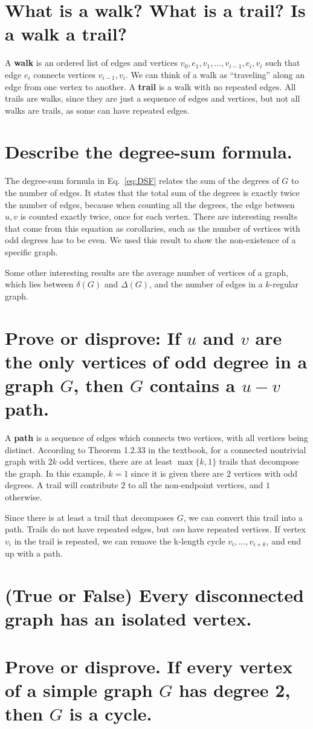\documentclass{article}
\begin{document}
\section{What is a walk? What is a trail? Is a walk a trail?}
A \textbf{walk} is an ordered list of edges and vertices $v_0, e_1, v_1, \dots,v_{i-1}, e_{i}, v_{i}$ such that edge $e_i$
connects vertices $v_{i-1}, v_i$.
We can think of a walk as ``traveling'' along an edge from one vertex to another.
A \textbf{trail} is a walk with no repeated edges.
All trails are walks, since they are just a sequence of edges and vertices, but not all walks are trails, as some
can have repeated edges.

\section{Describe the degree-sum formula.}
The degree-sum formula in Eq.~\ref{eq:DSF} relates the sum of the degrees of $G$ to the number of edges.
It states that the total sum of the degrees is exactly twice the number of edges, because when counting all the degrees,
the edge between $u,v$ is counted exactly twice, once for each vertex.
There are interesting results that come from this equation as corollaries, such as the number of vertices with odd
degrees has to be even.
We used this result to show the non-existence of a specific graph.

Some other interesting results are the average number of vertices of a graph, which lies between $\delta(G)$ and $\Delta(G)$,
and the number of edges in a $k$-regular graph.

\section{Prove or disprove: If $u$ and $v$ are the only vertices of odd degree in a graph $G$, then $G$ contains a $u-v$ path.}
A \textbf{path} is a sequence of edges which connects two vertices, with all vertices being distinct.
According to Theorem 1.2.33 in the textbook, for a connected nontrivial graph with $2k$ odd vertices, there are at least
$\max\{k, 1\}$ trails that decompose the graph.
In this example, $k=1$ since it is given there are $2$ vertices with odd degrees.
A trail will contribute $2$ to all the non-endpoint vertices, and $1$ otherwise.

Since there is at least a trail that decomposes $G$, we can convert this trail into a path.
Trails do not have repeated edges, but \emph{can} have repeated vertices.
If vertex $v_i$ in the trail is repeated, we can remove the k-length cycle $v_i,\dots,v_{i+k}$, and end up with a path.

\section{(True or False) Every disconnected graph has an isolated vertex.}
\section{Prove or disprove. If every vertex of a simple graph $G$ has degree 2, then $G$ is a cycle.}
\end{document}
